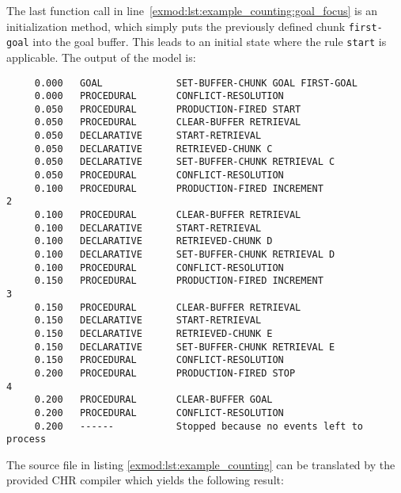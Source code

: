 The last function call in line~\ref{exmod:lst:example_counting:goal_focus} is an initialization method, which simply puts the previously defined chunk \lstinline|first-goal| into the goal buffer. This leads to an initial state where the rule \lstinline|start| is applicable. The output of the model is:

\begin{lstlisting}
     0.000   GOAL             SET-BUFFER-CHUNK GOAL FIRST-GOAL 
     0.000   PROCEDURAL       CONFLICT-RESOLUTION 
     0.050   PROCEDURAL       PRODUCTION-FIRED START 
     0.050   PROCEDURAL       CLEAR-BUFFER RETRIEVAL 
     0.050   DECLARATIVE      START-RETRIEVAL 
     0.050   DECLARATIVE      RETRIEVED-CHUNK C 
     0.050   DECLARATIVE      SET-BUFFER-CHUNK RETRIEVAL C 
     0.050   PROCEDURAL       CONFLICT-RESOLUTION 
     0.100   PROCEDURAL       PRODUCTION-FIRED INCREMENT 
2 
     0.100   PROCEDURAL       CLEAR-BUFFER RETRIEVAL 
     0.100   DECLARATIVE      START-RETRIEVAL 
     0.100   DECLARATIVE      RETRIEVED-CHUNK D 
     0.100   DECLARATIVE      SET-BUFFER-CHUNK RETRIEVAL D 
     0.100   PROCEDURAL       CONFLICT-RESOLUTION 
     0.150   PROCEDURAL       PRODUCTION-FIRED INCREMENT 
3 
     0.150   PROCEDURAL       CLEAR-BUFFER RETRIEVAL 
     0.150   DECLARATIVE      START-RETRIEVAL 
     0.150   DECLARATIVE      RETRIEVED-CHUNK E 
     0.150   DECLARATIVE      SET-BUFFER-CHUNK RETRIEVAL E 
     0.150   PROCEDURAL       CONFLICT-RESOLUTION 
     0.200   PROCEDURAL       PRODUCTION-FIRED STOP 
4 
     0.200   PROCEDURAL       CLEAR-BUFFER GOAL 
     0.200   PROCEDURAL       CONFLICT-RESOLUTION 
     0.200   ------           Stopped because no events left to process 
\end{lstlisting}

The source file in listing \ref{exmod:lst:example_counting} can be translated by the provided CHR compiler which yields the following result:

